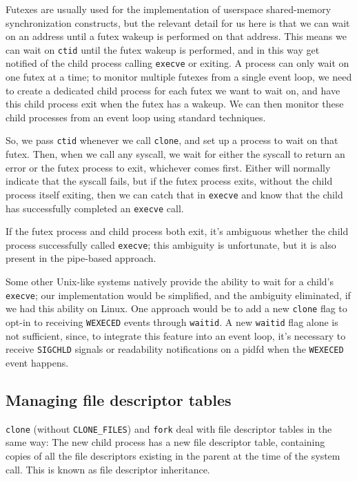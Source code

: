 \documentclass[letterpaper,twocolumn,10pt]{article}
\begin{document}
Futexes are usually used for the implementation of userspace shared-memory synchronization constructs,
but the relevant detail for us here is that we can wait on an address
until a futex wakeup is performed on that address.\cite{futex}
This means we can wait on \texttt{ctid} until the futex wakeup is performed,
and in this way get notified of the child process calling \texttt{execve} or exiting.
A process can only wait on one futex at a time;
to monitor multiple futexes from a single event loop,
we need to create a dedicated child process for each futex we want to wait on,
and have this child process exit when the futex has a wakeup.
We can then monitor these child processes from an event loop using standard techniques.\cite{signalfd}\cite{pidfd}

So, we pass \texttt{ctid} whenever we call \texttt{clone},
and set up a process to wait on that futex.
Then, when we call any syscall,
we wait for either the syscall to return an error or the futex process to exit,
whichever comes first.
Either will normally indicate that the syscall fails,
but if the futex process exits,
without the child process itself exiting,
then we can catch that in \texttt{execve}
and know that the child has successfully completed an \texttt{execve} call.

If the futex process and child process both exit,
it's ambiguous whether the child process successfully called \texttt{execve};
this ambiguity is unfortunate, but it is also present in the pipe-based approach.

Some other Unix-like systems natively provide the ability to wait for a child's \texttt{execve};
our implementation would be simplified, and the ambiguity eliminated,
if we had this ability on Linux.\cite{freebsd_kqueue}
One approach would be to add a new \texttt{clone} flag to
opt-in to receiving \texttt{WEXECED} events through \texttt{waitid}.
A new \texttt{waitid} flag alone is not sufficient,
since, to integrate this feature into an event loop,
it's necessary to receive \texttt{SIGCHLD} signals or readability notifications on a pidfd
when the \texttt{WEXECED} event happens.
\subsection{Managing file descriptor tables}\label{fdtables}
\texttt{clone} (without \verb|CLONE_FILES|) and \texttt{fork}
deal with file descriptor tables in the same way:
The new child process has a new file descriptor table,
containing copies of all the file descriptors existing in the parent at the time of the system call.
This is known as file descriptor inheritance.
\end{document}
